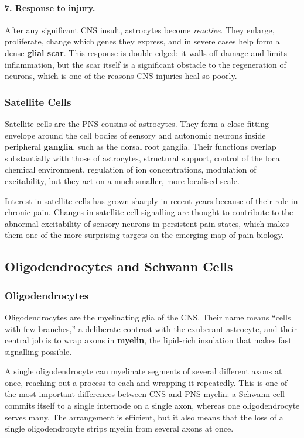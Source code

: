 \documentclass[11pt]{article}
\begin{document}
\paragraph{7. Response to injury.} After any significant CNS insult, astrocytes become \textit{reactive}. They enlarge, proliferate, change which genes they express, and in severe cases help form a dense \textbf{glial scar}. This response is double-edged: it walls off damage and limits inflammation, but the scar itself is a significant obstacle to the regeneration of neurons, which is one of the reasons CNS injuries heal so poorly.

\subsubsection{Satellite Cells}

Satellite cells are the PNS cousins of astrocytes. They form a close-fitting envelope around the cell bodies of sensory and autonomic neurons inside peripheral \textbf{ganglia}, such as the dorsal root ganglia. Their functions overlap substantially with those of astrocytes, structural support, control of the local chemical environment, regulation of ion concentrations, modulation of excitability, but they act on a much smaller, more localised scale.

Interest in satellite cells has grown sharply in recent years because of their role in chronic pain. Changes in satellite cell signalling are thought to contribute to the abnormal excitability of sensory neurons in persistent pain states, which makes them one of the more surprising targets on the emerging map of pain biology.

\subsection{Oligodendrocytes and Schwann Cells}

\subsubsection{Oligodendrocytes}

Oligodendrocytes are the myelinating glia of the CNS. Their name means ``cells with few branches,'' a deliberate contrast with the exuberant astrocyte, and their central job is to wrap axons in \textbf{myelin}, the lipid-rich insulation that makes fast signalling possible.

A single oligodendrocyte can myelinate segments of several different axons at once, reaching out a process to each and wrapping it repeatedly. This is one of the most important differences between CNS and PNS myelin: a Schwann cell commits itself to a single internode on a single axon, whereas one oligodendrocyte serves many. The arrangement is efficient, but it also means that the loss of a single oligodendrocyte strips myelin from several axons at once.
\end{document}
